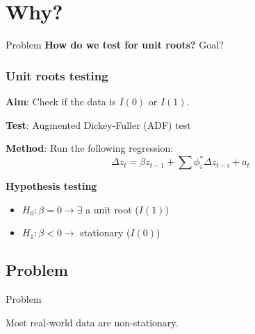 \section{Why?}


\begin{frame}{Problem}
	\textbf{How do we test for unit roots?}
	Goal?
\end{frame}

\begin{frame}[allowframebreaks]
	\frametitle{Unit roots testing}
	
	\textbf{Aim}: Check if the data is $I(0)$ or $I(1)$.
	
	\textbf{Test}: Augmented Dickey-Fuller (ADF) test
	
	\textbf{Method}: Run the following regression:
	$$\Delta z_t = \beta z_{t-1} + \sum \phi_i^* \Delta z_{t-i} + a_t$$
	
	\framebreak
	
	\textbf{Hypothesis testing}
	\begin{itemize}
		\item $H_0: \beta = 0 \rightarrow \exists$ a unit root ($I(1)$)
		\item $H_1: \beta < 0 \rightarrow$ stationary ($I(0)$)
	\end{itemize}
\end{frame}


\subsection{Problem}
\begin{frame}{Problem}
	\begin{center}
		Most real-world data are non-stationary.
	\end{center}
\end{frame}

